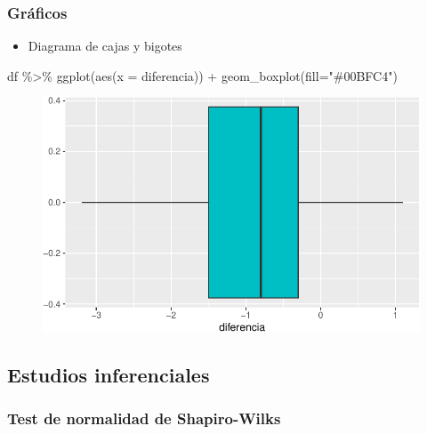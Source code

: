 \documentclass[
  a4paper,
]{scrreport}
\newenvironment{Shaded}{\begin{snugshade}}{\end{snugshade}}
\newcommand{\AttributeTok}[1]{\textcolor[rgb]{0.40,0.45,0.13}{#1}}
\newcommand{\FunctionTok}[1]{\textcolor[rgb]{0.28,0.35,0.67}{#1}}
\newcommand{\NormalTok}[1]{\textcolor[rgb]{0.00,0.23,0.31}{#1}}
\newcommand{\SpecialCharTok}[1]{\textcolor[rgb]{0.37,0.37,0.37}{#1}}
\newcommand{\StringTok}[1]{\textcolor[rgb]{0.13,0.47,0.30}{#1}}
\providecommand{\tightlist}{%
  \setlength{\itemsep}{0pt}\setlength{\parskip}{0pt}}\usepackage{longtable,booktabs,array}
\theoremstyle{definition}
\theoremstyle{definition}
\theoremstyle{remark}
\begin{document}
\hypertarget{gruxe1ficos-3}{%
\subsubsection{Gráficos}\label{gruxe1ficos-3}}

\begin{itemize}
\tightlist
\item
  Diagrama de cajas y bigotes
\end{itemize}

\begin{Shaded}
\begin{Highlighting}[]
\NormalTok{df }\SpecialCharTok{\%\textgreater{}\%} \FunctionTok{ggplot}\NormalTok{(}\FunctionTok{aes}\NormalTok{(}\AttributeTok{x =}\NormalTok{ diferencia)) }\SpecialCharTok{+} 
  \FunctionTok{geom\_boxplot}\NormalTok{(}\AttributeTok{fill=}\StringTok{"\#00BFC4"}\NormalTok{)}
\end{Highlighting}
\end{Shaded}

\begin{figure}[H]

{\centering \includegraphics{08-analisis-estadisticos_files/figure-pdf/unnamed-chunk-40-1.pdf}

}

\end{figure}

\hypertarget{estudios-inferenciales-3}{%
\subsection{Estudios inferenciales}\label{estudios-inferenciales-3}}

\hypertarget{test-de-normalidad-de-shapiro-wilks-1}{%
\subsubsection{Test de normalidad de
Shapiro-Wilks}\label{test-de-normalidad-de-shapiro-wilks-1}}
\end{document}
